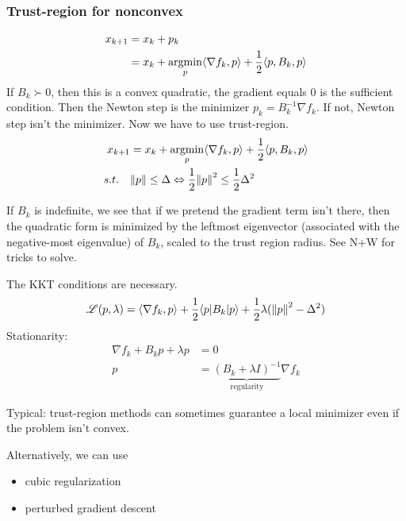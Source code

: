 \documentclass[class=article,crop=false]{standalone}
\begin{document}
\subsubsection{Trust-region for nonconvex}
\begin{align*}
	x_{k+1} &= x_k + p_k \\
	&= x_k + \operatorname*{argmin}_{p} \langle \nabla f_k, p \rangle + \frac{1}{2} \langle p,B_k,p \rangle
\end{align*}
If $ B_k \succ 0$, then this is a convex quadratic, the gradient equals 0 is the sufficient condition. Then the Newton step is the minimizer $ p_k = B_k^{-1} \nabla f_k$. If not, Newton step isn't the minimizer. Now we have to use trust-region.
\begin{align*}
	x_{k+1} &= x_k + \operatorname*{argmin}_{p} \langle \nabla f_k, p \rangle + \frac{1}{2} \langle p,B_k,p \rangle\\
	s.t. \quad  & {\left\lVert{ p}\right\rVert} \leq \Delta \Leftrightarrow \frac{1}{2}{\left\lVert{ p}\right\rVert}^2 \leq \frac{1}{2} \Delta^2 
\end{align*}
\begin{remark}
If $ B_k$ is indefinite, we see that if we pretend the gradient term isn't there, then the quadratic form is minimized by the leftmost eigenvector (associated with the negative-most eigenvalue) of $ B_k$, scaled to the trust region radius. See N+W for tricks to solve.
\end{remark}
The KKT conditions are necessary.
\begin{align*}
	\mathscr{L}(p, \lambda) = \langle \nabla f_k,p \rangle + \frac{1}{2} \langle p|B_k|p \rangle + \frac{1}{2} \lambda ({\left\lVert{ p}\right\rVert}^2 - \Delta^2 )
\end{align*}
Stationarity:
		\begin{align*}
			\nabla f_k + B_k p + \lambda p &= 0 \\
			p &= \underbrace{ (B_k + \lambda I)^{-1} }_{ \text{regularity} }  \nabla f_k
		\end{align*}
\begin{remark}
Typical: trust-region methods can sometimes guarantee a local minimizer even if the problem isn't convex.
\end{remark}
\begin{remark}
Alternatively, we can use
\begin{itemize}
	\item cubic regularization
	\item perturbed gradient descent
\end{itemize}
\end{remark}
\newpage
\end{document}
